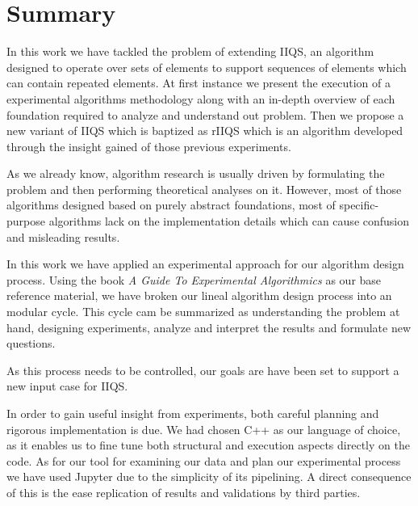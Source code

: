 \chapter{Summary}

In this work we have tackled the problem of extending IIQS, an algorithm designed to operate over sets of elements to support sequences of elements which can contain repeated elements. At first instance we present the execution of a experimental algorithms methodology along with an in-depth overview of each foundation required to analyze and understand out problem. Then we propose a new variant of IIQS which is baptized as rIIQS which is an algorithm developed through the insight gained of those previous experiments.

As we already know, algorithm research is usually driven by formulating the problem and then performing theoretical analyses on it. However, most of those algorithms designed based on purely abstract foundations, most of specific-purpose algorithms lack on the implementation details which can cause confusion and misleading results.

In this work we have applied an experimental approach for our algorithm design process. Using the book \emph{A Guide To Experimental Algorithmics}\cite{10.5555/2159557} as our base reference material, we have broken our lineal algorithm design process into an modular cycle. This cycle cam be summarized as understanding the problem at hand, designing experiments, analyze and interpret the results and formulate new questions.

As this process needs to be controlled, our goals are have been set to support a new input case for IIQS.

In order to gain useful insight from experiments, both careful planning and rigorous implementation is due. We had chosen C++ as our language of choice, as it enables us to fine tune both structural and execution aspects directly on the code. As for our tool for examining our data and plan our experimental process we have used Jupyter due to the simplicity of its pipelining. A direct consequence of this is the ease replication of results and validations by third parties.

